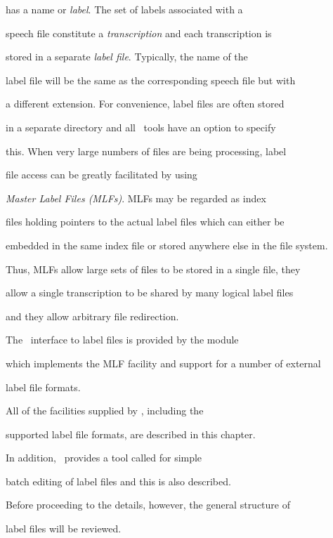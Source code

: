 has a name or \textit{label}.  The set of labels associated with a


speech file constitute a \textit{transcription} and each transcription is


stored in a separate \textit{label file}.  Typically, the name of the


label file will be the same as the corresponding speech file but with


a different extension.  For convenience, label files are often stored


in a separate directory and all \HTK\ tools have an option to specify


this.  When very large numbers of files are being processing, label


file access can be greatly facilitated by using


\textit{Master Label Files (MLFs)}.  MLFs may be regarded as index


files holding pointers to the actual label files which can either be


embedded in the same index file or stored anywhere else in the file system.


Thus, MLFs allow large sets of files to be stored in a single file, they


allow a single transcription to be shared by many logical label files


and they allow arbitrary file redirection.





The \HTK\ interface to label files is provided by the module 


which implements the MLF facility and support for a number of external


label file formats. 


All of the facilities supplied by , including the


supported label file formats, are described in this chapter.


In addition, \HTK\ provides a tool called  for simple 


batch editing of label files and this is also described.


Before proceeding to the details, however, the general structure of


label files will be reviewed.





